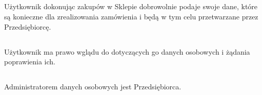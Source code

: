 
			\subsection{} Użytkownik dokonując zakupów w Sklepie dobrowolnie podaje swoje dane, które są konieczne dla zrealizowania zamówienia i będą w tym celu przetwarzane przez Przedsiębiorcę.

			\subsection{} Użytkownik ma prawo wglądu do dotyczących go danych osobowych i żądania poprawienia ich.
			
			\subsection{} Administratorem danych osobowych jest Przedsiębiorca.
 

